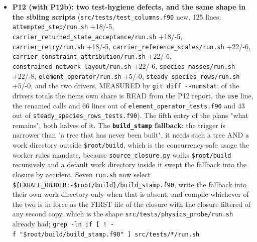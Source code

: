 \documentclass[english,a4paper]{my_memo}
\begin{document}
\begin{itemize}
  every pass line is identical but the momentum entry, which falls \textbf{1.32E-12
  to 3.22E-13} after pass 1 (4.47E-13 and 3.54E-13 at passes 2 and 3), the
  state as loaded reading 3.622E-01 to \textbf{3.311E-01} in its scaled momentum
  row, and all four output files byte-identical. What stays open: the
  kind-generic \texttt{EXHALE\_RESID\_QUAD} assembly still hands back neither the momentum
  terms nor the face departures, so under that option (default off, a rounding
  control experiment nothing is adopted from) both are read from the last
  \texttt{RK\_rhs} evaluation rather than from the state just assembled; the fix
  belongs in \texttt{hydrodynamic\_rows.f90}, which this item does not own.
\item
  \textbf{P12 (with P12b): two test-hygiene defects, and the same shape in the
  sibling scripts} (\texttt{src/tests/test\_columns.f90} new, 125 lines;
  \texttt{attempted\_step/run.sh} +18/-5, \texttt{carrier\_returned\_state\_acceptance/run.sh}
  +18/-5, \texttt{carrier\_retry/run.sh} +18/-5, \texttt{carrier\_reference\_scales/run.sh}
  +22/-6, \texttt{carrier\_constraint\_attribution/run.sh} +22/-6,
  \texttt{constrained\_network\_layout/run.sh} +22/-6, \texttt{species\_masses/run.sh} +22/-8,
  \texttt{element\_operator/run.sh} +5/-0, \texttt{steady\_species\_rows/run.sh} +5/-0, and the
  two drivers, MEASURED by \texttt{git\ diff\ -\/-numstat}; of the drivers\textquotesingle{} totals the
  item\textquotesingle s own share is READ from the P12 report, the \texttt{use} line, the renamed
  calls and 66 lines out of \texttt{element\_operator\_tests.f90} and 43 out of
  \texttt{steady\_species\_rows\_tests.f90}). The fifth entry of the plan\textquotesingle s "what
  remains", both halves of it. The \textbf{\texttt{build\_stamp} fallback}: the trigger is
  narrower than "a tree that has never been built", it needs such a tree AND a
  work directory outside \texttt{\$root/build}, which is the concurrency-safe usage
  the worker rules mandate, because \texttt{source\_closure.py} walks \texttt{\$root/build}
  recursively and a default work directory inside it swept the fallback into
  the closure by accident. Seven \texttt{run.sh} now select
  \texttt{\$\{EXHALE\_OBJDIR:-\$root/build\}/build\_stamp.f90}, write the fallback into
  their own work directory only when that is absent, and compile whichever of
  the two is in force as the FIRST file of the closure with the closure
  filtered of any second copy, which is the shape
  \texttt{src/tests/physics\_probe/run.sh} already had;
  \texttt{grep\ -ln\ \textquotesingle{}if\ {[}\ !\ -f\ "\$root/build/build\_stamp.f90"\ {]}\textquotesingle{}\ src/tests/*/run.sh}

\end{itemize}
\end{document}
